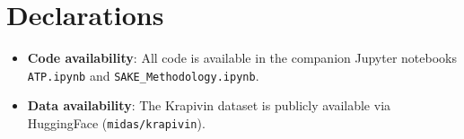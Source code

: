 \documentclass[pdflatex,sn-mathphys-num]{sn-jnl}
\begin{document}
\section*{Declarations}

\begin{itemize}
\item \textbf{Code availability}: All code is available in the companion Jupyter notebooks
      \texttt{ATP.ipynb} and \texttt{SAKE\_Methodology.ipynb}.
\item \textbf{Data availability}: The Krapivin dataset is publicly available via HuggingFace
      (\texttt{midas/krapivin}).
\end{itemize}


\end{document}
